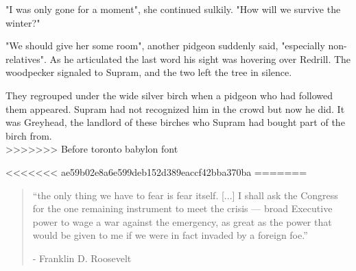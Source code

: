 \documentclass[smalldemyvopaper,11pt,twoside,onecolumn,openright,extrafontsizes]{memoir}
\begin{document}
"I was only gone for a moment", she continued sulkily. "How will we survive the winter?"

"We should give her some room", another pidgeon suddenly said, "especially non-relatives". As he articulated the last word his sight was hovering over Redrill. The woodpecker signaled to Supram, and the two left the tree in silence.

They regrouped under the wide silver birch when a pidgeon who had followed them appeared. Supram had not recognized him in the crowd but now he did. It was Greyhead, the landlord of these birches who Supram had bought part of the birch from. \\
>>>>>>> Before toronto babylon font


\mainmatter




<<<<<<< ae59b02e8a6e599deb152d389eaccf42bba370ba
=======
\vspace{-1.3cm}
\begin{localsize}{10}
	\begin{quote}
		“the only thing we have to fear is fear itself. [...] I shall ask the Congress for the one remaining instrument to meet the crisis — broad Executive power to wage a war against the emergency, as great as the power that would be given to me if we were in fact invaded by a foreign foe.”
		\begin{flushright}- Franklin D. Roosevelt \end{flushright}
	\end{quote} 
\end{localsize}
\vspace{1cm}
\end{document}
